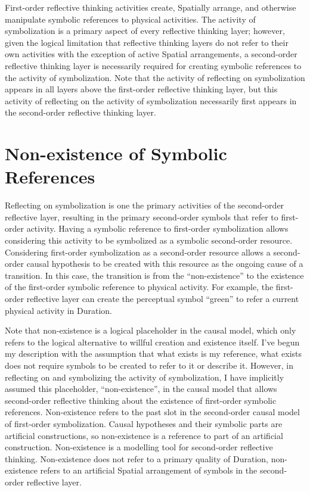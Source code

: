 First-order reflective thinking activities create, Spatially arrange,
and otherwise manipulate symbolic references to physical activities.
The activity of symbolization is a primary aspect of every reflective
thinking layer; however, given the logical limitation that reflective
thinking layers do not refer to their own activities with the
exception of active Spatial arrangements, a second-order reflective
thinking layer is necessarily required for creating symbolic
references to the activity of symbolization.  Note that the activity
of reflecting on symbolization appears in all layers above the
first-order reflective thinking layer, but this activity of reflecting
on the activity of symbolization necessarily first appears in the
second-order reflective thinking layer.

\section{Non-existence of Symbolic References}

Reflecting on symbolization is one the primary activities of the
second-order reflective layer, resulting in the primary second-order
symbols that refer to first-order activity.  Having a symbolic
reference to first-order symbolization allows considering this
activity to be symbolized as a symbolic second-order resource.
Considering first-order symbolization as a second-order resource
allows a second-order causal hypothesis to be created with this
resource as the ongoing cause of a transition.  In this case, the
transition is from the ``non-existence'' to the existence of the
first-order symbolic reference to physical activity.  For example, the
first-order reflective layer can create the perceptual symbol
``green'' to refer a current physical activity in Duration.

Note that non-existence is a logical placeholder in the causal model,
which only refers to the logical alternative to willful creation and
existence itself.  I've begun my description with the assumption that
what exists is my reference, what exists does not require symbols to
be created to refer to it or describe it.  However, in reflecting on
and symbolizing the activity of symbolization, I have implicitly
assumed this placeholder, ``non-existence'', in the causal model that
allows second-order reflective thinking about the existence of
first-order symbolic references.  Non-existence refers to the past
slot in the second-order causal model of first-order symbolization.
Causal hypotheses and their symbolic parts are artificial
constructions, so non-existence is a reference to part of an
artificial construction.  Non-existence is a modelling tool for
second-order reflective thinking.  Non-existence does not refer to a
primary quality of Duration, non-existence refers to an artificial
Spatial arrangement of symbols in the second-order reflective layer.

